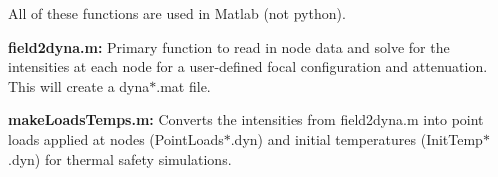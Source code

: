 All of these functions are used in Matlab (not python).


\begin{DoxyItemize}
\item {\bfseries field2dyna.\+m\+:} Primary function to read in node data and solve for the intensities at each node for a user-\/defined focal configuration and attenuation. This will create a {\ttfamily dyna$\ast$.mat} file.
\item {\bfseries make\+Loads\+Temps.\+m\+:} Converts the intensities from {\ttfamily field2dyna.\+m} into point loads applied at nodes ({\ttfamily Point\+Loads$\ast$.dyn}) and initial temperatures ({\ttfamily Init\+Temp$\ast$.dyn}) for thermal safety simulations. 
\end{DoxyItemize}